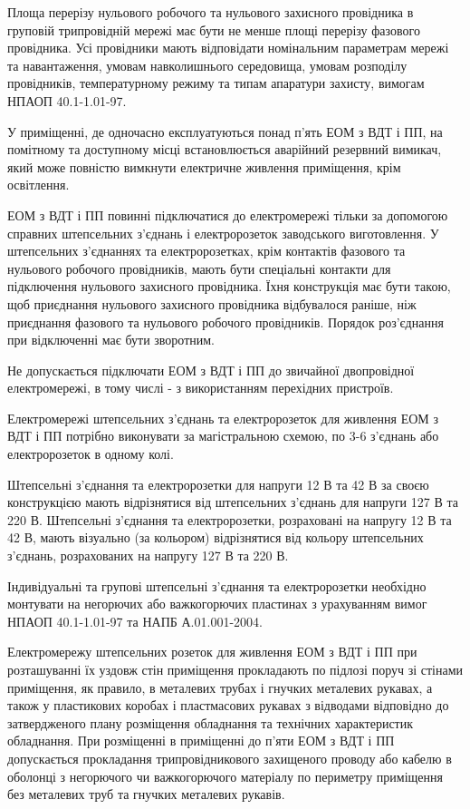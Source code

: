 \documentclass[ukrainian,utf8,simple,floatsubsection, hpadding=5mm,equationsubsection,]{eskdtext}
\begin{document}
Площа перерізу нульового робочого та нульового захисного провідника в груповій трипровідній мережі має бути не менше площі перерізу фазового провідника. Усі провідники мають відповідати номінальним параметрам мережі та навантаження, умовам навколишнього середовища, умовам розподілу провідників, температурному режиму та типам апаратури захисту, вимогам НПАОП 40.1-1.01-97.

У приміщенні, де одночасно експлуатуються понад п'ять ЕОМ з ВДТ і ПП, на помітному та доступному місці встановлюється аварійний резервний вимикач, який може повністю вимкнути електричне живлення приміщення, крім освітлення.

ЕОМ з ВДТ і ПП повинні підключатися до електромережі тільки за допомогою справних штепсельних з'єднань і електророзеток заводського виготовлення.
У штепсельних з'єднаннях та електророзетках, крім контактів фазового та нульового робочого провідників, мають бути спеціальні контакти для підключення нульового захисного провідника. Їхня конструкція має бути такою, щоб приєднання нульового захисного провідника відбувалося раніше, ніж приєднання фазового та нульового робочого провідників. Порядок роз'єднання при відключенні має бути зворотним.

Не допускається підключати ЕОМ з ВДТ і ПП до звичайної двопровідної електромережі, в тому числі - з використанням перехідних пристроїв.

Електромережі штепсельних з'єднань та електророзеток для живлення ЕОМ з ВДТ і ПП потрібно виконувати за магістральною схемою, по 3-6 з'єднань або електророзеток в одному колі.

Штепсельні з'єднання та електророзетки для напруги 12 В та 42 В за своєю конструкцією мають відрізнятися від штепсельних з'єднань для напруги 127 В та 220 В.
Штепсельні з'єднання та електророзетки, розраховані на напругу 12 В та 42 В, мають візуально (за кольором) відрізнятися від кольору штепсельних з'єднань, розрахованих на напругу 127 В та 220 В.

Індивідуальні та групові штепсельні з'єднання та електророзетки необхідно монтувати на негорючих або важкогорючих пластинах з урахуванням вимог НПАОП 40.1-1.01-97 та НАПБ А.01.001-2004.

Електромережу штепсельних розеток для живлення ЕОМ з ВДТ і ПП при розташуванні їх уздовж стін приміщення прокладають по підлозі поруч зі стінами приміщення, як правило, в металевих трубах і гнучких металевих рукавах, а також у пластикових коробах і пластмасових рукавах з відводами відповідно до затвердженого плану розміщення обладнання та технічних характеристик обладнання.
При розміщенні в приміщенні до п'яти ЕОМ з ВДТ і ПП допускається прокладання трипровідникового захищеного проводу або кабелю в оболонці з негорючого чи важкогорючого матеріалу по периметру приміщення без металевих труб та гнучких металевих рукавів.
\end{document}

